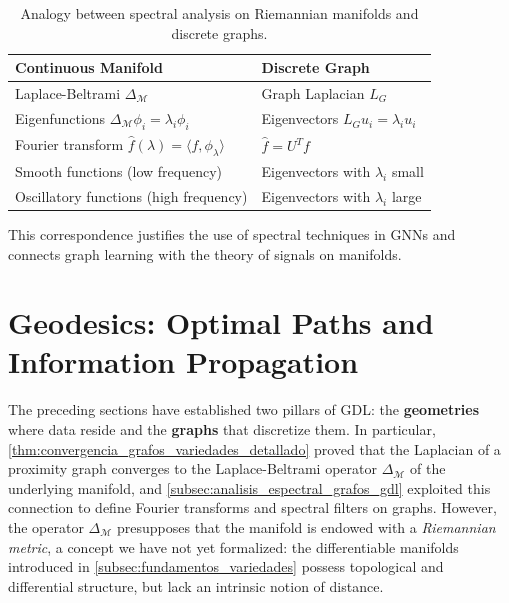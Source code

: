\begin{table}[htbp]
\centering
\begin{tabular}{|l|l|}
\hline
\textbf{Continuous Manifold} & \textbf{Discrete Graph} \\
\hline
Laplace-Beltrami $\Delta_\mathcal{M}$ & Graph Laplacian $L_G$ \\
Eigenfunctions $\Delta_\mathcal{M} \phi_i = \lambda_i \phi_i$ & Eigenvectors $L_G u_i = \lambda_i u_i$ \\
Fourier transform $\hat{f}(\lambda) = \langle f, \phi_\lambda \rangle$ & $\hat{f} = U^T f$ \\
Smooth functions (low frequency) & Eigenvectors with $\lambda_i$ small \\
Oscillatory functions (high frequency) & Eigenvectors with $\lambda_i$ large \\
\hline
\end{tabular}
\caption[Analogy between spectral analysis on manifolds and graphs]{Analogy between spectral analysis on Riemannian manifolds and discrete graphs.}
\label{tab:analogia_espectral_variedades_grafos}
\end{table}

This correspondence justifies the use of spectral techniques in \glspl{GNN} and connects graph learning with the theory of signals on manifolds.
\section{Geodesics: Optimal Paths and Information Propagation}\label{sec:geodesicas_propagacion}

The preceding sections have established two pillars of \gls{GDL}: the \textbf{geometries} where data reside and the \textbf{graphs} that discretize them. In particular, \autoref{thm:convergencia_grafos_variedades_detallado} proved that the Laplacian of a proximity graph converges to the Laplace-Beltrami operator $\Delta_\mathcal{M}$ of the underlying manifold, and \autoref{subsec:analisis_espectral_grafos_gdl} exploited this connection to define Fourier transforms and spectral filters on graphs. However, the operator $\Delta_\mathcal{M}$ presupposes that the manifold is endowed with a \textit{Riemannian metric}, a concept we have not yet formalized: the differentiable manifolds introduced in \autoref{subsec:fundamentos_variedades} possess topological and differential structure, but lack an intrinsic notion of distance.

